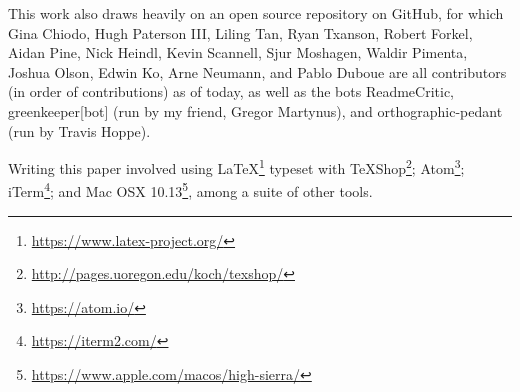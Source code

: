 \documentclass[12pt,a4paper]{article}
\begin{document}
\noindent This work also draws heavily on an open source repository on GitHub, for which Gina Chiodo, Hugh Paterson III, Liling Tan, Ryan Txanson, Robert Forkel, Aidan Pine, Nick Heindl, Kevin Scannell, Sjur Moshagen, Waldir Pimenta, Joshua Olson, Edwin Ko, Arne Neumann, and Pablo Duboue are all contributors (in order of contributions) as of today, as well as the bots ReadmeCritic, greenkeeper[bot] (run by my friend, Gregor Martynus), and orthographic-pedant (run by Travis Hoppe).

Writing this paper involved using LaTeX\footnote{\href{https://www.latex-project.org/}{https://www.latex-project.org/}} typeset with TeXShop\footnote{\href{http://pages.uoregon.edu/koch/texshop/}{http://pages.uoregon.edu/koch/texshop/}}; Atom\footnote{\href{https://atom.io/}{https://atom.io/}}; iTerm\footnote{\href{https://iterm2.com/}{https://iterm2.com/}}; and Mac OSX 10.13\footnote{\href{https://www.apple.com/macos/high-sierra/}{https://www.apple.com/macos/high-sierra/}}, among a suite of other tools.

\newpage

%
\tableofcontents
\thispagestyle{empty}

\newpage

\listoffigures
\listoftables

\setcounter{page}{1}

\end{document}
